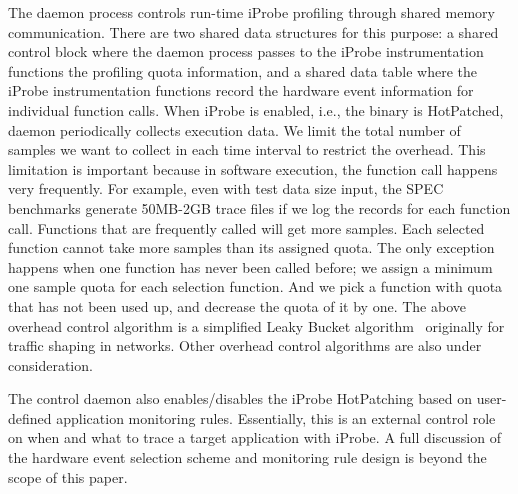 The daemon process controls run-time iProbe profiling through shared memory communication.  
There are two shared data structures for this purpose: a shared control block where the daemon process passes to the iProbe instrumentation functions the profiling quota information, and a shared data table where the iProbe instrumentation functions record the hardware event information for individual function calls. 
When iProbe is enabled, i.e., the binary is HotPatched, daemon periodically collects execution data. 
We limit the total number of samples we want to collect in each time interval to restrict the overhead.  
This limitation is important because in software execution, the function call happens very frequently. 
For example, even with test data size input, the SPEC benchmarks generate 50MB-2GB trace files if we log the records for each function call. 
Functions that are frequently called will get more samples. 
Each selected function cannot take more samples than its assigned quota. 
The only exception happens when one function has never been called before; we assign a minimum one sample quota for each selection function. 
And we pick a function with quota that has not been used up, and decrease the quota of it by one. 
The above overhead control algorithm is a simplified Leaky Bucket algorithm~\cite{lba} originally for traffic shaping in networks. Other overhead control algorithms are also under consideration.

The control daemon also enables/disables the iProbe HotPatching based on user-defined application monitoring rules.
Essentially, this is an external control role on when and what to trace a target application with iProbe.
A full discussion of the hardware event selection scheme and monitoring rule design is beyond the scope of this paper. 
